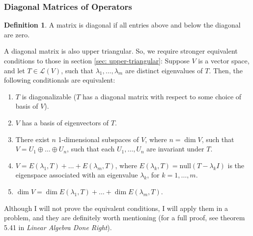 \documentclass{article}
\renewcommand{\L}{\mathcal{L}}
\newcommand{\nulls}{\mathrm{null}}
\theoremstyle{definition}
\newtheorem{definition}{Definition}
\begin{document}
\subsubsection{Diagonal Matrices of Operators}
\begin{definition}
    A matrix is diagonal if all entries above and below the diagonal are zero.
\end{definition}
A diagonal matrix is also upper triangular. So, we require stronger equivalent conditions to those in section \ref{sec: upper-triangular}: Suppose $V$ is a vector space, and let $T \in \L(V)$, such that $\lambda_1, \dots, \lambda_m$ are distinct eigenvalues of $T$. Then, the following conditionals are equivalent:
\begin{enumerate}[label=(\alph*)]
    \item $T$ is diagonalizable ($T$ has a diagonal matrix with respect to some choice of basis of $V$).
    \item $V$ has a basis of eigenvectors of $T$.
    \item There exist $n$ 1-dimensional subspaces of $V$, where $n = \dim V$, such that $V = U_1 \oplus \dots \oplus U_n$, such that each $U_1, \dots, U_n$ are invariant under $T$.
    \item $V = E(\lambda_1, T) + \dots + E(\lambda_m, T)$, where $E(\lambda_k, T) = \nulls(T - \lambda_k I)$ is the eigenspace associated with an eigenvalue $\lambda_k$, for $k = 1, \dots, m$.
    \item $\dim V = \dim  E(\lambda_1, T) + \dots + \dim E(\lambda_m, T)$.
\end{enumerate}
Although I will not prove the equivalent conditions, I will apply them in a problem, and they are definitely worth mentioning (for a full proof, see theorem 5.41 in \textit{Linear Algebra Done Right}).
\end{document}

